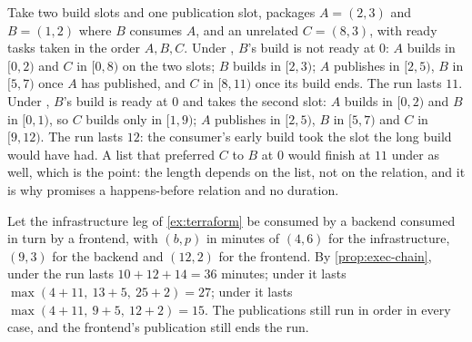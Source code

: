 \begin{example}
\label{ex:exec-anomaly}
Take two build slots and one publication slot, packages $A = (2, 3)$ and $B =
(1, 2)$ where $B$ consumes $A$, and an unrelated $C = (8, 3)$, with ready tasks
taken in the order $A, B, C$. Under , $B$'s build is not ready at
$0$: $A$ builds in $[0,2)$ and $C$ in $[0,8)$ on the two slots; $B$ builds in
$[2,3)$; $A$ publishes in $[2,5)$, $B$ in $[5,7)$ once $A$ has published, and
$C$ in $[8,11)$ once its build ends. The run lasts $11$. Under ,
$B$'s build is ready at $0$ and takes the second slot: $A$ builds in $[0,2)$
and $B$ in $[0,1)$, so $C$ builds only in $[1,9)$; $A$ publishes in $[2,5)$,
$B$ in $[5,7)$ and $C$ in $[9,12)$. The run lasts $12$: the consumer's early
build took the slot the long build would have had. A list that preferred $C$
to $B$ at $0$ would finish at $11$ under  as well, which is the
point: the length depends on the list, not on the relation, and it is why
 promises a happens-before relation and no duration.
\end{example}

\begin{example}
\label{ex:exec-chain}
Let the infrastructure leg of \cref{ex:terraform} be consumed by a backend
consumed in turn by a frontend, with $(b, p)$ in minutes of $(4, 6)$ for the
infrastructure, $(9, 3)$ for the backend and $(12, 2)$ for the frontend. By
\cref{prop:exec-chain}, under  the run lasts $10 + 12 + 14 = 36$
minutes; under  it lasts $\max(4 + 11,\ 13 + 5,\ 25 + 2) = 27$;
under  it lasts $\max(4 + 11,\ 9 + 5,\ 12 + 2) = 15$. The
publications still run in order in every case, and the frontend's publication
still ends the run.
\end{example}

